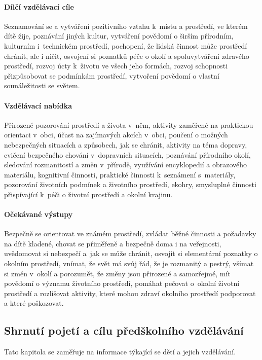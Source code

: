 				\paragraph{Dílčí vzdělávací cíle}
					Seznamování se a vytváření pozitivního vztahu k místu a prostředí, ve kterém dítě žije, poznávání jiných kultur, vytváření povědomí o širším přírodním, kulturním i technickém prostředí, pochopení, že lidská činnost může prostředí chránit, ale i ničit, osvojení si poznatků péče o okolí a spoluvytváření zdravého prostředí, rozvoj úcty k životu ve všech jeho formách, rozvoj schopnosti přizpůsobovat se podmínkám prostředí, vytvoření povědomí o vlastní sounáležitosti se světem.
				\paragraph{Vzdělávací nabídka}
					Přirozené pozorování prostředí a života v něm, aktivity zaměřené na praktickou orientaci v obci, účast na zajímavých akcích v obci, poučení o možných nebezpečných situacích a způsobech, jak se chránit, aktivity na téma dopravy, cvičení bezpečného chování v dopravních situacích, poznávání přírodního okolí, sledování rozmanitostí a změn v přírodě, využívání encyklopedií a obrazového materiálu, kognitivní činnosti, praktické činnosti k seznámení s materiály, pozorování životních podmínek a životního prostředí, ekohry, smysluplné činnosti přispívající k péči o životní prostředí a okolní krajinu.
				\paragraph{Očekávané výstupy}
					Bezpečně se orientovat ve známém prostředí, zvládat běžné činnosti a požadavky na dítě kladené, chovat se přiměřeně a bezpečně doma i na veřejnosti, uvědomovat si nebezpečí a jak se může chránit, osvojit si elementární poznatky o okolním prostředí, vnímat, že svět má svůj řád, že je rozmanitý a pestrý, všímat si změn v okolí a porozumět, že změny jsou přirozené a samozřejmé, mít povědomí o významu životního prostředí, pomáhat pečovat o okolní životní prostředí a rozlišovat aktivity, které mohou zdraví okolního prostředí podporovat a které poškozovat.

 			\subsection{Shrnutí pojetí a cílu předškolního vzdělávání}

				Tato kapitola se zaměřuje na informace týkající se dětí a jejich vzdělávání.

